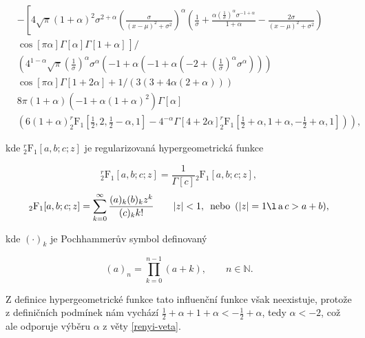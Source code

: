 \begin{eqnarray}
&-\left[4 \sqrt{\pi } (1+\alpha )^2 \sigma ^{2+\alpha } \left(\frac{\sigma }{(x-\mu )^2+\sigma ^2}\right)^{\alpha } \left(\frac{1}{\sigma }+\frac{\alpha  \left(\frac{1}{\sigma }\right)^{\alpha } \sigma ^{-1+\alpha }}{1+\alpha }-\frac{2 \sigma }{(x-\mu )^2+\sigma ^2}\right) \right. \nonumber \\
&\left. \cos[\pi  \alpha ] \Gamma[\alpha ] \Gamma[1+\alpha ]  \frac{}{} \right] / \nonumber \\ %
&\left(4^{1-\alpha } \sqrt{\pi } \left(\frac{1}{\sigma }\right)^{\alpha } \sigma ^{\alpha } \left(-1+\alpha  \left(-1+\alpha  \left(-2+\left(\frac{1}{\sigma }\right)^{\alpha } \sigma ^{\alpha }\right)\right)\right) \right.\nonumber \\ 
&\left. \cos[\pi  \alpha ] \Gamma[1+2 \alpha ]+1/(3 (3+4 \alpha  (2+\alpha )))\right. \nonumber \\
& 8 \pi  (1+\alpha ) \left(-1+\alpha  (1+\alpha )^2\right) \Gamma[\alpha ] \nonumber \\
&\left. \left(6 (1+\alpha ) ^r_2\mathrm{F}_1\left[\frac{1}{2},2,\frac{1}{2}-\alpha ,1\right]-4^{-\alpha } \Gamma[4+2 \alpha ] ^r_2\mathrm{F}_1\left[\frac{1}{2}+\alpha ,1+\alpha ,-\frac{1}{2}+\alpha ,1\right]\right)\right),
\end{eqnarray}

\noindent kde $^r_2\mathrm{F}_1[a,b;c;z]$ je regularizovaná hypergeometrická funkce 

\begin{equation}
	^r_2\mathrm{F}_1[a,b;c;z] = {\frac{1}{\Gamma[c]}} {_2\mathrm{F}_1}[a,b;c;z],
\end{equation}
\begin{equation}
	{_2\mathrm{F}_1}[a,b;c;z]=\sum _{k=0}^{\infty } \frac{(a)_k (b)_k z^k}{ (c)_k k!} \qquad |z|<1, \, \text{ nebo } \, (|z|=1\l  \,\text{a} \,  c>a+b),
\end{equation}

\noindent kde $(\cdot)_k$ je Pochhammerův symbol definovaný

\begin{equation}
(a)_n=\prod _{k=0}^{n-1} (a+k), \qquad n \in \mathbb{N}.
\end{equation}

\noindent Z definice hypergeometrické funkce tato influenční funkce však neexistuje, protože z definičních podmínek nám vychází $\frac{1}{2}+\alpha  + 1+\alpha < -\frac{1}{2}+\alpha $, tedy $\alpha < -2$, což ale odporuje výběru $\alpha$ z věty \ref{renyi-veta}.





 


